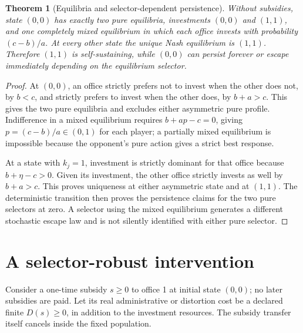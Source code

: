 \documentclass[11pt,a4paper]{article}
\newtheorem{theorem}{Theorem}[section]
\theoremstyle{definition}
\theoremstyle{remark}
\begin{document}
\begin{theorem}[Equilibria and selector-dependent persistence]
Without subsidies, state $(0,0)$ has exactly two pure equilibria, investments $(0,0)$ and $(1,1)$, and one completely mixed equilibrium in which each office invests with probability $(c-b)/a$. At every other state the unique Nash equilibrium is $(1,1)$. Therefore $(1,1)$ is self-sustaining, while $(0,0)$ can persist forever or escape immediately depending on the equilibrium selector.
\end{theorem}
\begin{proof}
At $(0,0)$, an office strictly prefers not to invest when the other does not, by $b<c$, and strictly prefers to invest when the other does, by $b+a>c$. This gives the two pure equilibria and excludes either asymmetric pure profile. Indifference in a mixed equilibrium requires $b+a p-c=0$, giving $p=(c-b)/a\in(0,1)$ for each player; a partially mixed equilibrium is impossible because the opponent's pure action gives a strict best response.

At a state with $k_j=1$, investment is strictly dominant for that office because $b+\eta-c>0$. Given its investment, the other office strictly invests as well by $b+a>c$. This proves uniqueness at either asymmetric state and at $(1,1)$. The deterministic transition then proves the persistence claims for the two pure selectors at zero. A selector using the mixed equilibrium generates a different stochastic escape law and is not silently identified with either pure selector.
\end{proof}

\section{A selector-robust intervention}
Consider a one-time subsidy $s\geq0$ to office 1 at initial state $(0,0)$; no later subsidies are paid. Let its real administrative or distortion cost be a declared finite $D(s)\geq0$, in addition to the investment resources. The subsidy transfer itself cancels inside the fixed population.
\end{document}
